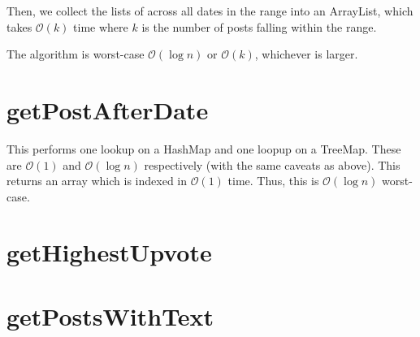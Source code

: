 \documentclass[11pt,a4paper]{article} %
\begin{document}
Then, we collect the lists of across all dates in the range into an ArrayList, which takes 
$\mathcal O(k)$ time where $k$ is the number of posts falling within the range.

The algorithm is worst-case $\mathcal O(\log n)$ or $\mathcal O(k)$, whichever is larger.


\section*{getPostAfterDate}
This performs one lookup on a HashMap and one loopup on a TreeMap. 
These are $\mathcal O(1)$ and $\mathcal O(\log n)$ respectively
(with the same caveats as above). This returns an array
which is indexed in $\mathcal O(1)$ time.
Thus, this is $\mathcal O(\log n)$ worst-case.

\section*{getHighestUpvote}


\section*{getPostsWithText}



\end{document}
